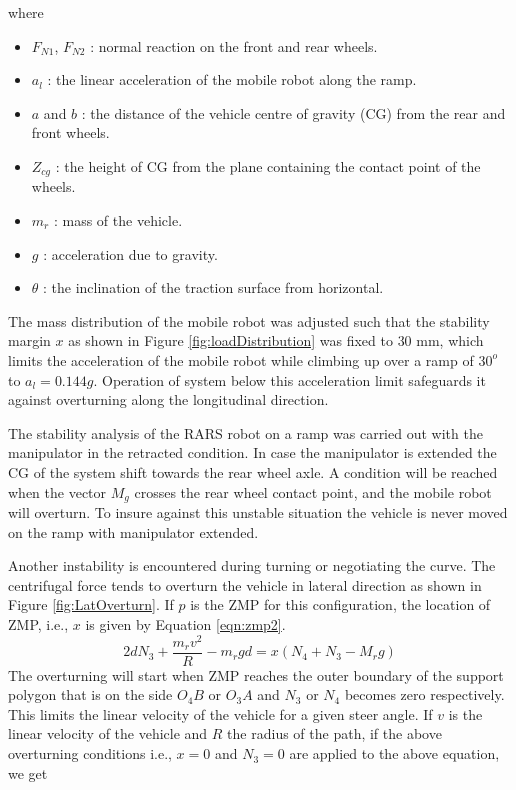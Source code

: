 where 
\begin{itemize}
\item[] $F_{N1}$, $F_{N2}$ :  normal reaction on the front and rear wheels.
\item [] $ a_l$ : the linear acceleration of the mobile robot along the ramp.
\item[] $a$ and $b$ :  the distance of the vehicle centre of gravity (CG) from the rear and front wheels.
\item [] $Z_{cg}$ :  the height of  CG from the  plane containing the contact point of the wheels.
\item [] $m_r$ : mass of the vehicle.
\item [] $g$ : acceleration due to gravity.
\item[] $\theta$ :  the inclination of the traction surface from horizontal.
\end{itemize}
The mass distribution of the mobile robot was  adjusted such that the stability margin $x$ as shown in Figure \ref{fig:loadDistribution} was fixed to $30$ mm, which  limits  the acceleration of the mobile robot while climbing up  over a ramp of $30^o$ to $ a_l=0.144g$. Operation of system below this acceleration limit safeguards it against overturning along the longitudinal direction. 

The stability analysis of the RARS robot on a ramp  was carried out with the manipulator in the retracted condition. In case the manipulator is extended  the CG of the system shift towards the rear wheel axle. A condition will be reached when the vector $M_g$ crosses the rear wheel contact point, and the mobile robot will overturn. To insure against this unstable situation the vehicle is never moved on the ramp with manipulator extended.
   
Another instability is encountered during turning or negotiating the curve. The centrifugal force tends to overturn the vehicle in lateral direction as shown in Figure \ref{fig:LatOverturn}.
If $p$ is the ZMP for this configuration, the location of ZMP, i.e., $x$ is given by Equation \ref{eqn:zmp2}. 
\begin{equation}
\label{eqn:zmp2}
2dN_3+ \frac{m_r v^2}{R}-m_r g d=x(N_4+N_3-M_r g)
\end{equation}
The overturning will start when ZMP reaches the outer boundary of the support polygon that is on the side $O_4B$ or $O_3A$ and $N_3$ or $N_4$ becomes zero respectively.
This limits the linear velocity of the vehicle for a given steer angle. If $v$ is the linear velocity of the vehicle and $R$ the radius of the path, if the above overturning conditions i.e., $x=0$ and $N_3=0$  are applied to the above equation, we get


